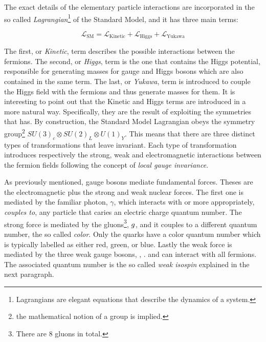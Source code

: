 The exact details of the elementary particle interactions are incorporated in the so called
{\it Lagrangian}\footnote{ Lagrangians are elegant equations that describe the dynamics of a system.} of the Standard Model,
and it has three main terms:

\begin{equation}
\mathscr{L}_{\text{SM}} =
\mathscr{L}_{\text{Kinetic}} + \mathscr{L}_{\text{Higgs}} + \mathscr{L}_{\text{Yukawa}}
\label{lagrangian}
\end{equation}

\noindent The first, or {\it Kinetic}, term describes the possible interactions between the fermions.
The second, or {\it Higgs}, term is the one that contains the Higgs potential, responsible for generating
masses for gauge and Higgs bosons which are also contained in the same term.
The last, or {\it Yukawa}, term is introduced to couple the Higgs field with the fermions and thus generate masses for them.
It is interesting to point out that the Kinetic and Higgs terms are introduced in a more natural way.
Specifically, they are the result of exploiting the symmetries that  has.
By construction, the Standard Model Lagrangian obeys the symmetry group\footnote{the mathematical notion of a group is implied.}
$SU(3)_c\otimes SU(2)_L\otimes U(1)_Y$. This means that there are three distinct types of transformations
that leave  invariant. Each type of transformation introduces respectively the strong,
weak and electromagnetic interactions between the fermion fields following the concept of {\it local gauge invariance}\cite{aitchison,halzen1984quarks}.

As previously mentioned, gauge bosons mediate fundamental forces. Theses are the electromagnetic plus the strong and weak nuclear forces.
The first one is mediated by the familiar photon, $\gamma$, which interacts with or more appropriately, {\it couples to}, any particle that
caries an electric charge quantum number. The strong force is mediated by the gluons\footnote{There are 8 gluons in total.}, $g$,
and it couples to a different quantum number, the so called {\it color}.
Only the quarks have a color quantum number which is typically labelled as either red, green, or blue. Lastly the
weak force is mediated by the three weak gauge bosons, \Wpm, \Z. and can interact with all fermions. The associated quantum number is
the so called {\it weak isospin} explained in the next paragraph.

